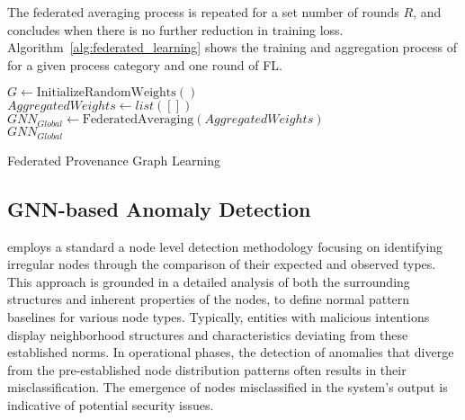 The federated averaging process is repeated for a set number of rounds \(R\), and concludes when there is no further reduction in training loss. Algorithm~\ref{alg:federated_learning} shows the training and aggregation process of \gnnshort for a given process category and one round of FL.

\begin{algorithm}[!t]
  \footnotesize
  \DontPrintSemicolon
  \BlankLine
  $G \leftarrow \text{InitializeRandomWeights}()$\\
  \BlankLine
  $AggregatedWeights \leftarrow list([])$\\
  $GNN_{Global} \leftarrow \text{FederatedAveraging}(AggregatedWeights)$\\
  \BlankLine
  \Return $GNN_{Global}$\\
  \BlankLine
  \caption{Federated Provenance Graph Learning}
  \label{alg:federated_learning}
\end{algorithm}

\subsection{GNN-based Anomaly Detection}
\label{sys:anomaly_detection}

\Sys employs a standard a node level detection methodology focusing on identifying irregular nodes through the comparison of their expected and observed types. This approach is grounded in a detailed analysis of both the surrounding structures and inherent properties of the nodes, to define normal pattern baselines for various node types. Typically, entities with malicious intentions display neighborhood structures and characteristics deviating from these established norms. In operational phases, the detection of anomalies that diverge from the pre-established node distribution patterns often results in their misclassification. The emergence of nodes misclassified in the system's output is indicative of potential security issues.

